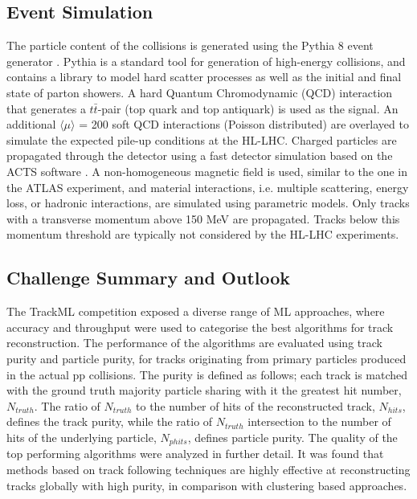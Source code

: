 

\subsection{Event Simulation}
\label{trackml-simulation}
The particle content of the collisions is generated using the Pythia 8 event generator \cite{pythia-8}. Pythia is a standard tool for generation of high-energy collisions, and contains a library to model hard scatter processes as well as the initial and final state of parton showers. A hard Quantum Chromodynamic (QCD) interaction that generates a $t\bar{t}$-pair (top quark and top antiquark) is used as the signal. An additional $\langle \mu \rangle$ = 200 soft QCD interactions (Poisson distributed) are overlayed to simulate the expected pile-up conditions at the HL-LHC. Charged particles are propagated through the detector using a fast detector simulation based on the ACTS software \cite{Gumpert_2017}. A non-homogeneous magnetic field is used, similar to the one in the ATLAS experiment, and material interactions, i.e. multiple scattering, energy loss, or hadronic interactions, are simulated using parametric models. Only tracks with a transverse momentum above 150 MeV are propagated. Tracks below this momentum threshold are typically not considered by the HL-LHC experiments.


\subsection{Challenge Summary and Outlook}
\label{trackml-key-findings}

The TrackML competition exposed a diverse range of ML approaches, where accuracy and throughput were used to categorise the best algorithms for track reconstruction. The performance of the algorithms are evaluated using track purity and particle purity, for tracks originating from primary particles produced in the actual pp collisions. The purity is defined as follows; each track is matched with the ground truth majority particle sharing with it the greatest hit number, $N_{truth}$. The ratio of $N_{truth}$ to the number of hits of the reconstructed track, $N_{hits}$, defines the track purity, while the ratio of $N_{truth}$ intersection to the number of hits of the underlying particle, $N_{phits}$, defines particle purity. The quality of the top performing algorithms were analyzed in further detail. It was found that methods based on track following techniques are highly effective at reconstructing tracks globally with high purity, in comparison with clustering based approaches. 

